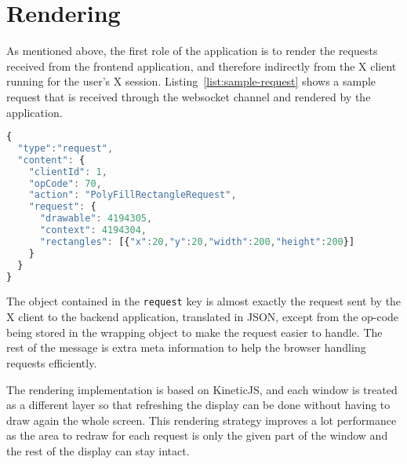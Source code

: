 \section{Rendering}
%
As mentioned above, the first role of the application is to render the requests received from 
the frontend application, and therefore indirectly from the X client running for the user's 
X session. Listing~\ref{list:sample-request} shows a sample request that is received 
through the websocket channel and rendered by the application.
\begin{lstlisting}[basicstyle=\footnotesize,caption=Sample request,language=javascript,label=list:sample-request]
{
  "type":"request",
  "content": {
    "clientId": 1,
    "opCode": 70,
    "action": "PolyFillRectangleRequest",
    "request": {
      "drawable": 4194305,
      "context": 4194304,
      "rectangles": [{"x":20,"y":20,"width":200,"height":200}]
    }
  }
}
\end{lstlisting}
The object contained in the \lstinline{request} key is almost exactly the request 
sent by the X client to the backend application, translated in JSON, except from the 
op-code being stored in the wrapping object to make the request easier to handle.
The rest of the message is extra meta information to help the browser handling 
requests efficiently. 

The rendering implementation is based on KineticJS, and each window is treated as 
a different layer so that refreshing the display can be done without having to 
draw again the whole screen. This rendering strategy improves a lot performance as the
area to redraw for each request is only the given part of the window and the rest of 
the display can stay intact.
